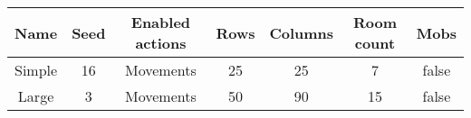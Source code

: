 \begin{tabular}{|c|c|c|c|c|c|c|}
\hline
Name & Seed & Enabled actions & Rows & Columns & Room count & Mobs\\
\hline
Simple & 16 & Movements & 25 & 25 & 7 & false\\
Large & 3 & Movements & 50 & 90 & 15 & false\\
\hline
\end{tabular}
